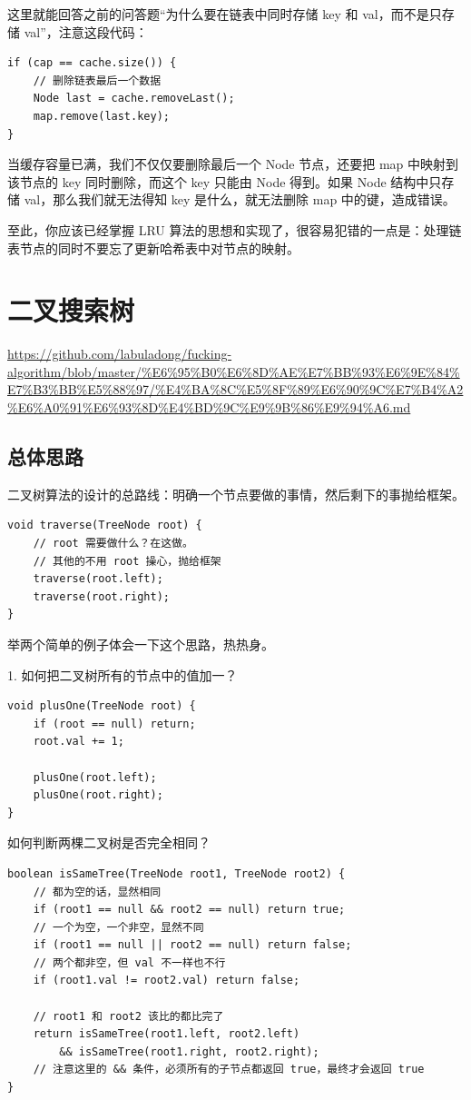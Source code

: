 \documentclass[12pt]{article}
\begin{document}
这里就能回答之前的问答题“为什么要在链表中同时存储 key 和 val，而不是只存储 val”，注意这段代码：
\begin{lstlisting}
if (cap == cache.size()) {
    // 删除链表最后一个数据
    Node last = cache.removeLast();
    map.remove(last.key);
}
\end{lstlisting}
当缓存容量已满，我们不仅仅要删除最后一个 Node 节点，还要把 map 中映射到该节点的 key 同时删除，而这个 key 只能由 Node 得到。如果 Node 结构中只存储 val，那么我们就无法得知 key 是什么，就无法删除 map 中的键，造成错误。

至此，你应该已经掌握 LRU 算法的思想和实现了，很容易犯错的一点是：处理链表节点的同时不要忘了更新哈希表中对节点的映射。

\section{二叉搜索树}
\url{https://github.com/labuladong/fucking-algorithm/blob/master/%E6%95%B0%E6%8D%AE%E7%BB%93%E6%9E%84%E7%B3%BB%E5%88%97/%E4%BA%8C%E5%8F%89%E6%90%9C%E7%B4%A2%E6%A0%91%E6%93%8D%E4%BD%9C%E9%9B%86%E9%94%A6.md}
\subsection{总体思路}
二叉树算法的设计的总路线：明确一个节点要做的事情，然后剩下的事抛给框架。
\begin{lstlisting}
void traverse(TreeNode root) {
    // root 需要做什么？在这做。
    // 其他的不用 root 操心，抛给框架
    traverse(root.left);
    traverse(root.right);
}
\end{lstlisting}

举两个简单的例子体会一下这个思路，热热身。

1. 如何把二叉树所有的节点中的值加一？
\begin{lstlisting}
void plusOne(TreeNode root) {
    if (root == null) return;
    root.val += 1;

    plusOne(root.left);
    plusOne(root.right);
}
\end{lstlisting}

如何判断两棵二叉树是否完全相同？
\begin{lstlisting}
boolean isSameTree(TreeNode root1, TreeNode root2) {
    // 都为空的话，显然相同
    if (root1 == null && root2 == null) return true;
    // 一个为空，一个非空，显然不同
    if (root1 == null || root2 == null) return false;
    // 两个都非空，但 val 不一样也不行
    if (root1.val != root2.val) return false;

    // root1 和 root2 该比的都比完了
    return isSameTree(root1.left, root2.left)
        && isSameTree(root1.right, root2.right);
    // 注意这里的 && 条件，必须所有的子节点都返回 true，最终才会返回 true
}
\end{lstlisting}
\end{document}
